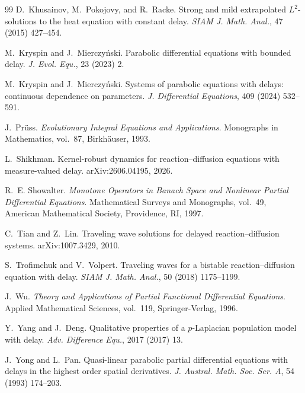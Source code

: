 \documentclass[a4paper,11pt,oneside,reqno]{amsart}
\newcounter{c}
\newcounter{d}
\newcounter{b}
\begin{document}
\begin{thebibliography}{99}
D.~Khusainov, M.~Pokojovy, and R.~Racke.
\newblock Strong and mild extrapolated \(L^2\)-solutions to the heat
equation with constant delay.
\newblock \emph{SIAM J. Math. Anal.},
47 (2015) 427--454.


M.~Kryspin and J.~Mierczy{\'n}ski.
\newblock Parabolic differential equations with bounded delay.
\newblock \emph{J. Evol. Equ.},
23 (2023) 2.


M.~Kryspin and J.~Mierczy{\'n}ski.
\newblock Systems of parabolic equations with delays:
continuous dependence on parameters.
\newblock \emph{J. Differential Equations},
409 (2024) 532--591.


J.~Pr{\"u}ss.
\newblock \emph{Evolutionary Integral Equations and Applications}.
\newblock Monographs in Mathematics, vol.~87,
Birkh\"auser, 1993.


L.~Shikhman.
\newblock Kernel-robust dynamics for reaction--diffusion equations
with measure-valued delay.
\newblock arXiv:2606.04195, 2026.


R.~E. Showalter.
\newblock \emph{Monotone Operators in Banach Space and Nonlinear
Partial Differential Equations}.
\newblock Mathematical Surveys and Monographs, vol.~49,
American Mathematical Society, Providence, RI, 1997.


C.~Tian and Z.~Lin.
\newblock Traveling wave solutions for delayed reaction--diffusion
systems.
\newblock arXiv:1007.3429, 2010.


S.~Trofimchuk and V.~Volpert.
\newblock Traveling waves for a bistable reaction--diffusion equation
with delay.
\newblock \emph{SIAM J. Math. Anal.},
50 (2018) 1175--1199.


J.~Wu.
\newblock \emph{Theory and Applications of Partial Functional
Differential Equations}.
\newblock Applied Mathematical Sciences, vol.~119,
Springer-Verlag, 1996.


Y.~Yang and J.~Deng.
\newblock Qualitative properties of a \(p\)-Laplacian population model
with delay.
\newblock \emph{Adv. Difference Equ.},
2017 (2017) 13.

J.~Yong and L.~Pan.
\newblock Quasi-linear parabolic partial differential equations with
delays in the highest order spatial derivatives.
\newblock \emph{J. Austral. Math. Soc. Ser. A},
54 (1993) 174--203.

\end{thebibliography}
\end{document}
